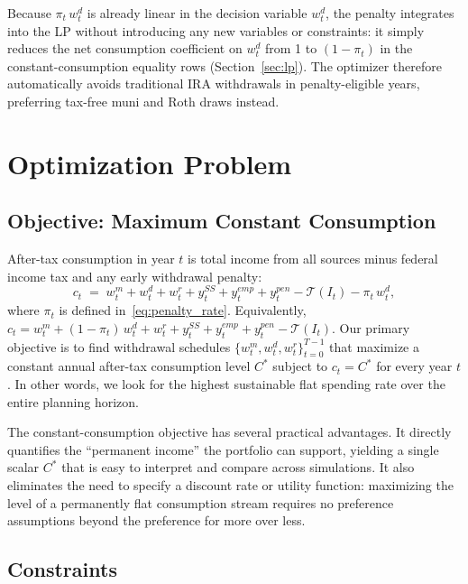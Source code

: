 \documentclass[12pt]{article}
\newcommand{\Tax}{\mathcal{T}}
\newcommand{\Copt}{C^{*}}
\begin{document}
Because $\pi_t\,w^d_t$ is already linear in the decision variable $w^d_t$,
the penalty integrates into the LP without introducing any new variables or
constraints: it simply reduces the net consumption coefficient on $w^d_t$
from 1 to $(1 - \pi_t)$ in the constant-consumption equality rows
(Section~\ref{sec:lp}).  The optimizer therefore automatically avoids
traditional IRA withdrawals in penalty-eligible years, preferring tax-free
muni and Roth draws instead.

\section{Optimization Problem}
\label{sec:opt}

\subsection{Objective: Maximum Constant Consumption}
\label{sec:objective}

After-tax consumption in year $t$ is total income from all sources minus
federal income tax and any early withdrawal penalty:
\begin{equation}
  c_t \;=\; w^m_t + w^d_t + w^r_t + y^{SS}_t + y^{emp}_t + y^{pen}_t
           - \Tax(I_t) - \pi_t\,w^d_t,
  \label{eq:consumption}
\end{equation}
where $\pi_t$ is defined in~\eqref{eq:penalty_rate}. Equivalently,
$c_t = w^m_t + (1-\pi_t)\,w^d_t + w^r_t + y^{SS}_t + y^{emp}_t + y^{pen}_t - \Tax(I_t)$.
Our primary objective is to find withdrawal schedules
$\{w^m_t, w^d_t, w^r_t\}_{t=0}^{T-1}$ that maximize a constant annual
after-tax consumption level $\Copt$ subject to $c_t = \Copt$ for every
year $t$. In other words, we look for the highest sustainable flat spending
rate over the entire planning horizon.

The constant-consumption objective has several practical advantages.  It
directly quantifies the ``permanent income'' the portfolio can support,
yielding a single scalar $\Copt$ that is easy to interpret and compare
across simulations.  It also eliminates the need to specify a discount rate
or utility function: maximizing the level of a permanently flat consumption
stream requires no preference assumptions beyond the preference for more over
less.

\subsection{Constraints}
\label{sec:constraints}
\end{document}
